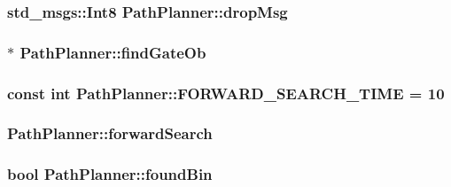 \subsubsection[{\texorpdfstring{drop\+Msg}{dropMsg}}]{\setlength{\rightskip}{0pt plus 5cm}std\+\_\+msgs\+::\+Int8 Path\+Planner\+::drop\+Msg}\hypertarget{classPathPlanner_aca9f8a364babea5db6c9ff8cc98addbc}{}\label{classPathPlanner_aca9f8a364babea5db6c9ff8cc98addbc}
\subsubsection[{\texorpdfstring{find\+Gate\+Ob}{findGateOb}}]{$\ast$ Path\+Planner\+::find\+Gate\+Ob}\hypertarget{classPathPlanner_a411050611aa7ccad2bcbfe8aa8c8698f}{}\label{classPathPlanner_a411050611aa7ccad2bcbfe8aa8c8698f}
\subsubsection[{\texorpdfstring{F\+O\+R\+W\+A\+R\+D\+\_\+\+S\+E\+A\+R\+C\+H\+\_\+\+T\+I\+ME}{FORWARD_SEARCH_TIME}}]{\setlength{\rightskip}{0pt plus 5cm}const int Path\+Planner\+::\+F\+O\+R\+W\+A\+R\+D\+\_\+\+S\+E\+A\+R\+C\+H\+\_\+\+T\+I\+ME = 10}\hypertarget{classPathPlanner_a12b219c458ee64a02f3255f76ad63be6}{}\label{classPathPlanner_a12b219c458ee64a02f3255f76ad63be6}
\subsubsection[{\texorpdfstring{forward\+Search}{forwardSearch}}]{ Path\+Planner\+::forward\+Search}\hypertarget{classPathPlanner_a2164113fa9ab422003bffad0454f5bb0}{}\label{classPathPlanner_a2164113fa9ab422003bffad0454f5bb0}
\subsubsection[{\texorpdfstring{found\+Bin}{foundBin}}]{\setlength{\rightskip}{0pt plus 5cm}bool Path\+Planner\+::found\+Bin}\hypertarget{classPathPlanner_ac649564f82726f564a0e4b1446886c5d}{}\label{classPathPlanner_ac649564f82726f564a0e4b1446886c5d}
